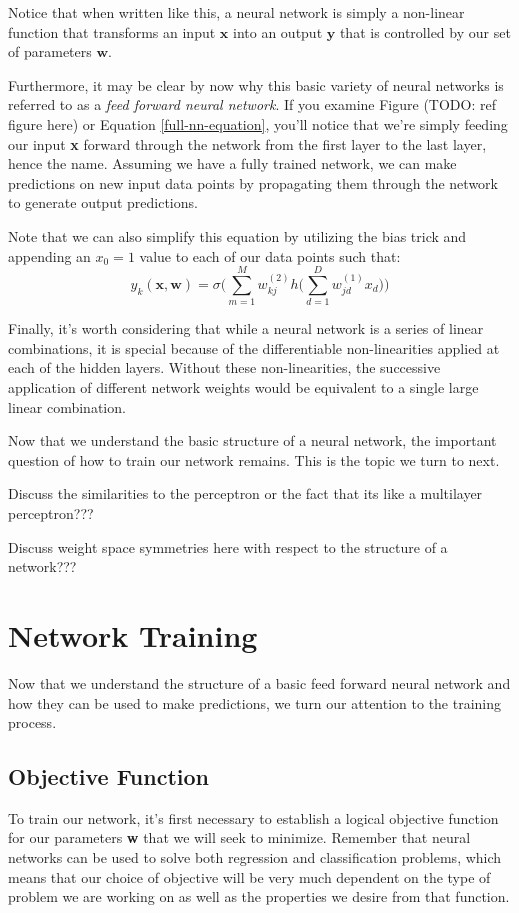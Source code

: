 Notice that when written like this, a neural network is simply a non-linear function that transforms an input $\textbf{x}$ into an output $\textbf{y}$ that is controlled by our set of parameters $\textbf{w}$.

Furthermore, it may be clear by now why this basic variety of neural networks is referred to as a \textit{feed forward neural network}. If you examine Figure (TODO: ref figure here) or Equation \ref{full-nn-equation}, you'll notice that we're simply feeding our input \textbf{x} forward through the network from the first layer to the last layer, hence the name. Assuming we have a fully trained network, we can make predictions on new input data points by propagating them through the network to generate output predictions.

Note that we can also simplify this equation by utilizing the bias trick and appending an $x_{0}=1$ value to each of our data points such that:
\begin{equation*}
	y_{k}(\textbf{x}, \textbf{w}) = \sigma\bigg(\sum_{m=1}^{M}w_{kj}^{(2)} h\bigg(\sum_{d=1}^{D}w_{jd}^{(1)}x_{d}\bigg)\bigg)
\end{equation*}

Finally, it's worth considering that while a neural network is a series of linear combinations, it is special because of the differentiable non-linearities applied at each of the hidden layers. Without these non-linearities, the successive application of different network weights would be equivalent to a single large linear combination.

Now that we understand the basic structure of a neural network, the important question of how to train our network remains. This is the topic we turn to next.

Discuss the similarities to the perceptron or the fact that its like a multilayer perceptron???

Discuss weight space symmetries here with respect to the structure of a network???

\section{Network Training}
Now that we understand the structure of a basic feed forward neural network and how they can be used to make predictions, we turn our attention to the training process.

\subsection{Objective Function}
To train our network, it's first necessary to establish a logical objective function for our parameters \textbf{w} that we will seek to minimize. Remember that neural networks can be used to solve both regression and classification problems, which means that our choice of objective will be very much dependent on the type of problem we are working on as well as the properties we desire from that function.

